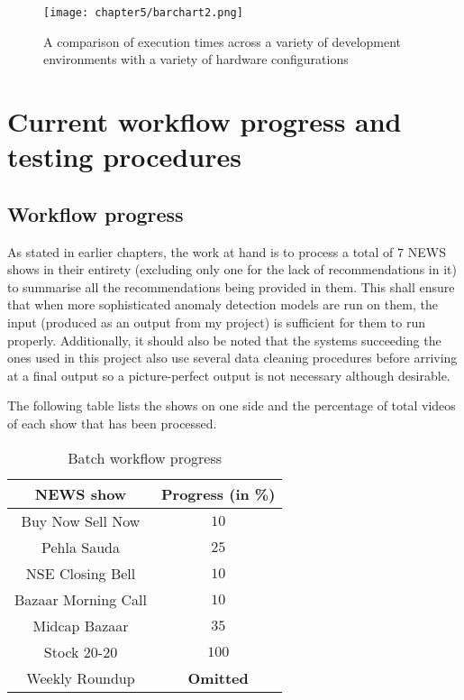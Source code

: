 \begin{figure}[h]
  \centering
  \texttt{[image: chapter5/barchart2.png]}
  \caption{A comparison of execution times across a variety of development environments with a variety of hardware configurations}
  \label{fig:hardware}
\end{figure}

\section{Current workflow progress and testing procedures}

\subsection{Workflow progress}

As stated in earlier chapters, the work at hand is to process a total of $7$ NEWS shows in their entirety (excluding only one for the lack of recommendations in it) to summarise all the recommendations being provided in them. This shall ensure that when more sophisticated anomaly detection models are run on them, the input (produced as an output from my project) is sufficient for them to run properly. Additionally, it should also be noted that the systems succeeding the ones used in this project also use several data cleaning procedures before arriving at a final output so a picture-perfect output is not necessary although desirable. \par

The following table lists the shows on one side and the percentage of total videos of each show that has been processed.

\begin{table}[h]
 \def\arraystretch{1.5}
 \centering
 \caption{Batch workflow progress}
 \begin{tabular}{|c|c|}
  \hline
  NEWS show & Progress (in \%)\\
  \hline
  Buy Now Sell Now & $10$                   \\
  \hline
  Pehla Sauda & $25$                   \\
  \hline
  NSE Closing Bell & $10$                   \\
  \hline
  Bazaar Morning Call & $10$                   \\
  \hline
  Midcap Bazaar & $35$                 \\
  \hline
  Stock 20-20 & $100$                \\
  \hline
  Weekly Roundup & \textbf{Omitted}               \\
  \hline
 \end{tabular}
 \label{tab:news_prog}
\end{table}


